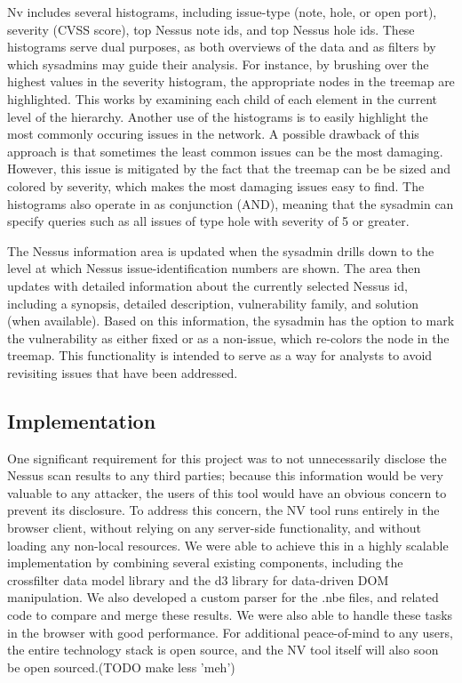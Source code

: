 \documentclass{acm_proc_article-sp}
\begin{document}
Nv includes several histograms, including issue-type (note, hole, or open port), severity (CVSS score), top Nessus note ids, and top Nessus hole ids.
These histograms serve dual purposes, as both overviews of the data and as filters by which sysadmins may guide their analysis.
For instance, by brushing over the highest values in the severity histogram, the appropriate nodes in the treemap are highlighted.
This works by examining each child of each element in the current level of the hierarchy.
Another use of the histograms is to easily highlight the most commonly occuring issues in the network.
A possible drawback of this approach is that sometimes the least common issues can be the most damaging.
However, this issue is mitigated by the fact that the treemap can be be sized and colored by severity, which makes the most damaging issues easy to find.
The histograms also operate in as conjunction (AND), meaning that the sysadmin can specify queries such as all issues of type hole with severity of 5 or greater.

The Nessus information area is updated when the sysadmin drills down to the level at which Nessus issue-identification numbers are shown.
The area then updates with detailed information about the currently selected Nessus id, including a synopsis, detailed description, vulnerability family, and solution (when available).
Based on this information, the sysadmin has the option to mark the vulnerability as either fixed or as a non-issue, which re-colors the node in the treemap.
This functionality is intended to serve as a way for analysts to avoid revisiting issues that have been addressed.


\subsection{Implementation}

One significant requirement for this project was to not unnecessarily disclose the Nessus scan results to any third parties; because this information would be very valuable to any attacker, the users of this tool would have an obvious concern to prevent its disclosure.
To address this concern, the NV tool runs entirely in the browser client, without relying on any server-side functionality, and without loading any non-local resources.
We were able to achieve this in a highly scalable implementation by combining several existing components, including the crossfilter data model library and the d3 library for data-driven DOM manipulation.
We also developed a custom parser for the .nbe files, and related code to compare and merge these results.
 We were also able to handle these tasks in the browser with good performance.
For additional peace-of-mind to any users, the entire technology stack is open source, and the NV tool itself will also soon be open sourced.(TODO make less 'meh')
\end{document}
